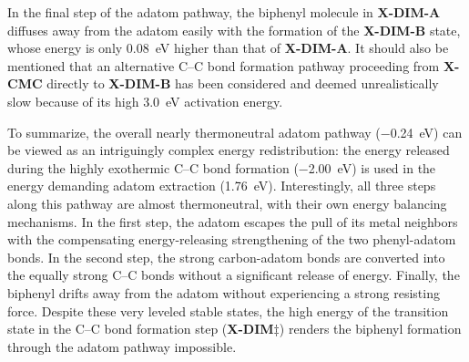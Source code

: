 \documentclass[aps,prb,amsmath,amssymb,11pt]{revtex4-1}
\newcommand{\zhzh}{\color{blue}}
\newcommand{\zhzh}{\color{blue}}
\begin{document}
In the final step of the adatom pathway, the biphenyl molecule in \textbf{X-DIM-A} diffuses away from the adatom easily with the formation of the \textbf{X-DIM-B} state, whose energy is only \SI{0.08}{\electronvolt} higher than that of \textbf{X-DIM-A}. It should also be mentioned that an alternative C--C bond formation pathway proceeding from \textbf{X-CMC} directly to \textbf{X-DIM-B} has been considered and deemed unrealistically slow because of its high \SI{3.0}{\electronvolt} activation energy.

To summarize, the overall nearly thermoneutral adatom pathway (\SI{-0.24}{\electronvolt}) can be viewed as an intriguingly complex energy redistribution: the energy released during the highly exothermic C--C bond formation (\SI{-2.00}{\electronvolt}) is used in the energy demanding adatom extraction (\SI{1.76}{\electronvolt}). Interestingly, all three steps along this pathway are  almost thermoneutral, with their own energy balancing mechanisms. %
In the first step, the adatom escapes the pull of its metal neighbors with the compensating energy-releasing strengthening of the two phenyl-adatom bonds. In the second step, the strong carbon-adatom bonds are converted into the equally strong C--C bonds without a significant release of energy. Finally, the biphenyl drifts away from the adatom without experiencing a strong resisting force. Despite these very leveled stable states, the high energy of the transition state in the C--C bond formation step (\textbf{X-DIM$\ddagger$}) renders the biphenyl formation through the adatom pathway impossible.


\end{document}
